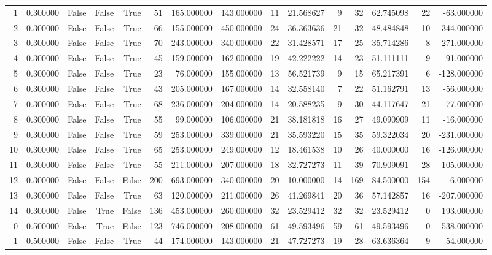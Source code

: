 \begin{table}[htbp]
\begin{tabular}{rrrrrrrrrrrrrrr}
1 & 0.300000 & False & False & True & 51 & 165.000000 & 143.000000 & 11 & 21.568627 & 9 & 32 & 62.745098 & 22 & -63.000000 \\
2 & 0.300000 & False & False & True & 66 & 155.000000 & 450.000000 & 24 & 36.363636 & 21 & 32 & 48.484848 & 10 & -344.000000 \\
3 & 0.300000 & False & False & True & 70 & 243.000000 & 340.000000 & 22 & 31.428571 & 17 & 25 & 35.714286 & 8 & -271.000000 \\
4 & 0.300000 & False & False & True & 45 & 159.000000 & 162.000000 & 19 & 42.222222 & 14 & 23 & 51.111111 & 9 & -91.000000 \\
5 & 0.300000 & False & False & True & 23 & 76.000000 & 155.000000 & 13 & 56.521739 & 9 & 15 & 65.217391 & 6 & -128.000000 \\
6 & 0.300000 & False & False & True & 43 & 205.000000 & 167.000000 & 14 & 32.558140 & 7 & 22 & 51.162791 & 13 & -56.000000 \\
7 & 0.300000 & False & False & True & 68 & 236.000000 & 204.000000 & 14 & 20.588235 & 9 & 30 & 44.117647 & 21 & -77.000000 \\
8 & 0.300000 & False & False & True & 55 & 99.000000 & 106.000000 & 21 & 38.181818 & 16 & 27 & 49.090909 & 11 & -16.000000 \\
9 & 0.300000 & False & False & True & 59 & 253.000000 & 339.000000 & 21 & 35.593220 & 15 & 35 & 59.322034 & 20 & -231.000000 \\
10 & 0.300000 & False & False & True & 65 & 253.000000 & 249.000000 & 12 & 18.461538 & 10 & 26 & 40.000000 & 16 & -126.000000 \\
11 & 0.300000 & False & False & True & 55 & 211.000000 & 207.000000 & 18 & 32.727273 & 11 & 39 & 70.909091 & 28 & -105.000000 \\
12 & 0.300000 & False & False & False & 200 & 693.000000 & 340.000000 & 20 & 10.000000 & 14 & 169 & 84.500000 & 154 & 6.000000 \\
13 & 0.300000 & False & False & True & 63 & 120.000000 & 211.000000 & 26 & 41.269841 & 20 & 36 & 57.142857 & 16 & -207.000000 \\
14 & 0.300000 & False & True & False & 136 & 453.000000 & 260.000000 & 32 & 23.529412 & 32 & 32 & 23.529412 & 0 & 193.000000 \\
0 & 0.500000 & False & True & False & 123 & 746.000000 & 208.000000 & 61 & 49.593496 & 59 & 61 & 49.593496 & 0 & 538.000000 \\
1 & 0.500000 & False & False & True & 44 & 174.000000 & 143.000000 & 21 & 47.727273 & 19 & 28 & 63.636364 & 9 & -54.000000 \\

\end{tabular}
\end{table}
